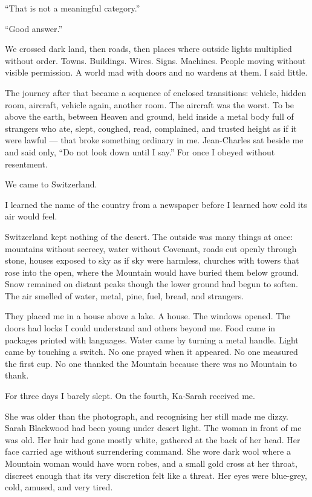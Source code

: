 ``That is not a meaningful category.''\par

``Good answer.''\par

We crossed dark land, then roads, then places where outside lights multiplied without order. Towns. Buildings. Wires. Signs. Machines. People moving without visible permission. A world mad with doors and no wardens at them. I said little.\par

The journey after that became a sequence of enclosed transitions: vehicle, hidden room, aircraft, vehicle again, another room. The aircraft was the worst. To be above the earth, between Heaven and ground, held inside a metal body full of strangers who ate, slept, coughed, read, complained, and trusted height as if it were lawful --- that broke something ordinary in me. Jean-Charles sat beside me and said only, ``Do not look down until I say.'' For once I obeyed without resentment.\par

We came to Switzerland.\par

I learned the name of the country from a newspaper before I learned how cold its air would feel.\par

Switzerland kept nothing of the desert. The outside was many things at once: mountains without secrecy, water without Covenant, roads cut openly through stone, houses exposed to sky as if sky were harmless, churches with towers that rose into the open, where the Mountain would have buried them below ground. Snow remained on distant peaks though the lower ground had begun to soften. The air smelled of water, metal, pine, fuel, bread, and strangers.\par

They placed me in a house above a lake. A house. The windows opened. The doors had locks I could understand and others beyond me. Food came in packages printed with languages. Water came by turning a metal handle. Light came by touching a switch. No one prayed when it appeared. No one measured the first cup. No one thanked the Mountain because there was no Mountain to thank.\par

For three days I barely slept. On the fourth, Ka-Sarah received me.\par

She was older than the photograph, and recognising her still made me dizzy. Sarah Blackwood had been young under desert light. The woman in front of me was old. Her hair had gone mostly white, gathered at the back of her head. Her face carried age without surrendering command. She wore dark wool where a Mountain woman would have worn robes, and a small gold cross at her throat, discreet enough that its very discretion felt like a threat. Her eyes were blue-grey, cold, amused, and very tired.\par

